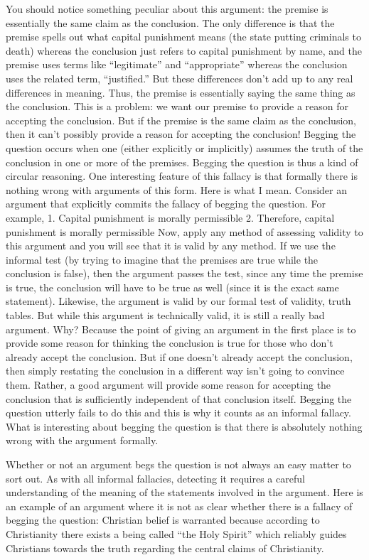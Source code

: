 You should notice something peculiar about this argument: the premise is
essentially the same claim as the conclusion. The only difference is that the
premise spells out what capital punishment means (the state putting criminals to
death) whereas the conclusion just refers to capital punishment by name, and
the premise uses terms like ``legitimate'' and ``appropriate'' whereas the
conclusion uses the related term, ``justified.'' But these differences don't add up
to any real differences in meaning. Thus, the premise is essentially saying the
same thing as the conclusion. This is a problem: we want our premise to
provide a reason for accepting the conclusion. But if the premise is the same
claim as the conclusion, then it can't possibly provide a reason for accepting the
conclusion! Begging the question occurs when one (either explicitly or
implicitly) assumes the truth of the conclusion in one or more of the premises.
Begging the question is thus a kind of circular reasoning.
One interesting feature of this fallacy is that formally there is nothing wrong with
arguments of this form. Here is what I mean. Consider an argument that
explicitly commits the fallacy of begging the question. For example,
1. Capital punishment is morally permissible
2. Therefore, capital punishment is morally permissible
Now, apply any method of assessing validity to this argument and you will see
that it is valid by any method. If we use the informal test (by trying to imagine
that the premises are true while the conclusion is false), then the argument
passes the test, since any time the premise is true, the conclusion will have to be
true as well (since it is the exact same statement). Likewise, the argument is
valid by our formal test of validity, truth tables. But while this argument is
technically valid, it is still a really bad argument. Why? Because the point of
giving an argument in the first place is to provide some reason for thinking the
conclusion is true for those who don't already accept the conclusion. But if one
doesn't already accept the conclusion, then simply restating the conclusion in a
different way isn't going to convince them. Rather, a good argument will
provide some reason for accepting the conclusion that is sufficiently
independent of that conclusion itself. Begging the question utterly fails to do
this and this is why it counts as an informal fallacy. What is interesting about
begging the question is that there is absolutely nothing wrong with the
argument formally.


Whether or not an argument begs the question is not always an easy matter to
sort out. As with all informal fallacies, detecting it requires a careful
understanding of the meaning of the statements involved in the argument. Here
is an example of an argument where it is not as clear whether there is a fallacy of
begging the question:
Christian belief is warranted because according to Christianity there exists
a being called ``the Holy Spirit'' which reliably guides Christians towards
the truth regarding the central claims of Christianity.

